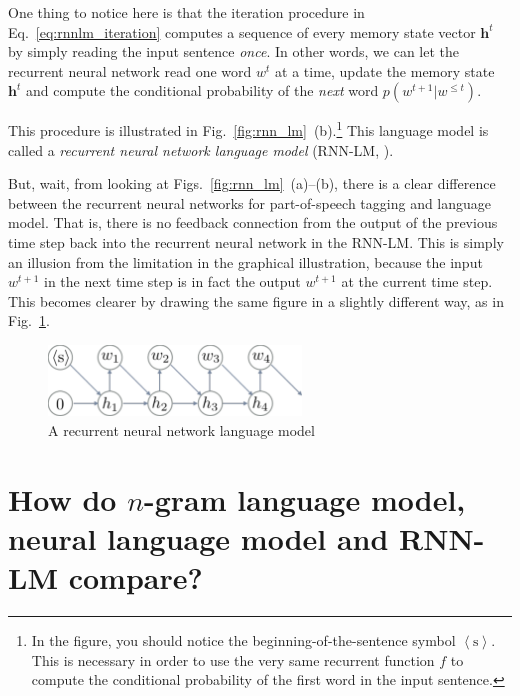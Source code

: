 \documentclass{report}
\newcommand{\vect}[1]{\mathbf{#1}}
\newcommand{\vh}[0]{\vect{h}}
\newcommand{\alert}[1]{\textcolor{red}{#1}}
\begin{document}
One thing to notice here is that the iteration procedure in
Eq.~\eqref{eq:rnnlm_iteration} computes a sequence of every memory state vector
$\vh^t$ by simply reading the input sentence {\em once}. In other words, we can
let the recurrent neural network read one word $w^t$ at a time, update the
memory state $\vh^t$ and compute the conditional probability of the {\em next}
word $p(w^{t+1}|w^{\leq t})$. 

This procedure is illustrated in Fig.~\ref{fig:rnn_lm}~(b).\footnote{
    In the figure, you should notice the beginning-of-the-sentence symbol
    $\left< \text{s} \right>$. This is necessary in order to use the very same
    recurrent function $f$ to compute the conditional probability of the first
    word in the input sentence.
}
This language model is called a {\em recurrent neural network language
model} (RNN-LM, \cite{mikolov2010recurrent}). 

But, wait, from looking at Figs.~\ref{fig:rnn_lm}~(a)--(b), there is a clear
difference between the recurrent neural networks for part-of-speech tagging and
language model. That is, there is no feedback connection from the output of the
previous time step back into the recurrent neural network in the RNN-LM.  This
is simply an illusion from the limitation in the graphical illustration, because
the input $w^{t+1}$ in the next time step is in fact the output $w^{t+1}$ at the
current time step. This becomes clearer by drawing the same figure in a slightly
different way, as in Fig.~\ref{fig:rnn_lm2}.

\begin{figure}[t]
    \centering
    \includegraphics[width=0.6\textwidth]{figures/rnn_lm2.pdf}

    \caption{
        A recurrent neural network language model
    }
    \label{fig:rnn_lm2}
\end{figure}

%

\section{How do $n$-gram language model, neural language model and RNN-LM
compare?}
\end{document}
